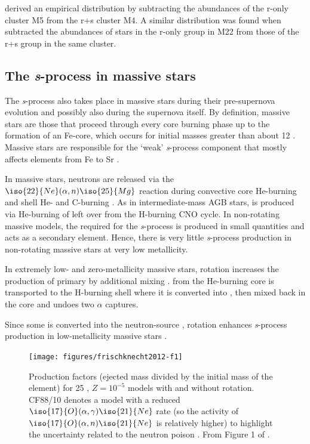 \documentclass[]{article}
\begin{document}
\citet{Yong:2008in} derived an empirical \sprocess distribution by subtracting the abundances of the r-only cluster M5 from the r+s cluster M4. A similar distribution was found when \citet{Roederer:2011hw} subtracted the abundances of stars in the r-only group in M22 from those of the r+s group in the same cluster.

\subsection{The \textit{s}-process in massive stars}
The \textit{s}-process also takes place in massive stars during their pre-supernova evolution and possibly also during the supernova itself. By definition, massive stars are those that proceed through every core burning phase up to the formation of an Fe-core, which occurs for initial masses greater than about 12 \Msun. Massive stars are responsible for the `weak' \textit{s}-process component that mostly affects elements from Fe to Sr \citep{Beer:1992jv, Pignatari:2010ir}.

In massive stars, neutrons are released via the $\iso{22}{Ne}(\alpha,n)\iso{25}{Mg}$ reaction \citep{Peters:1968bf} during convective core He-burning and shell He- and C-burning \citep{The:2007gb}. As in intermediate-mass AGB stars,  is produced via He-burning of  left over from the H-burning CNO cycle. In non-rotating massive models, the  required for the \textit{s}-process is produced in small quantities and acts as a secondary element. Hence, there is very little \textit{s}-process production in non-rotating massive stars at very low metallicity.

In extremely low- and zero-metallicity massive stars, rotation increases the production of primary  by additional mixing \citep{Meynet:2006bh,Hirschi:2007br}.  from the He-burning core is transported to the H-burning shell where it is converted into , then mixed back in the core and undoes two $\alpha$ captures.

Since some  is converted into the neutron-source , rotation enhances \textit{s}-process production in low-metallicity massive stars \citep{Pignatari:2008ec}.

\begin{figure}
 \begin{center}\texttt{[image: figures/frischknecht2012-f1]}\end{center}
 \caption{Production factors (ejected mass divided by the initial mass of the element) for 25 \Msun, $Z=10^{-5}$ models with and without rotation. CF88/10 denotes a model with a reduced $\iso{17}{O}(\alpha,\gamma)\iso{21}{Ne}$ rate (so the activity of $\iso{17}{O}(\alpha,n)\iso{21}{Ne}$ is relatively higher) to highlight the uncertainty related to the neutron poison . From Figure 1 of \citet{Frischknecht:2012il}.}\label{fig:frischknecht2012-f1}
\end{figure}
\end{document}
